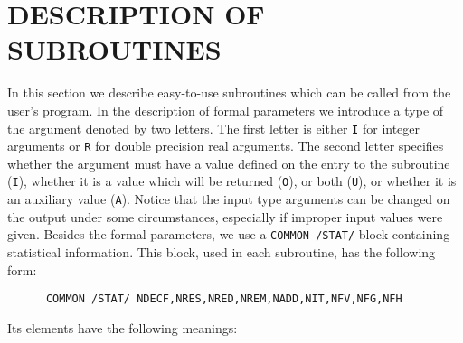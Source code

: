 \documentclass{article}
\begin{document}
\section*{DESCRIPTION OF SUBROUTINES}

\noindent In this section we describe easy-to-use subroutines
which can be called from the user's program. In the description of
formal parameters we introduce a type of the argument denoted by
two letters. The first letter is either \texttt{I} for integer
arguments or \texttt{R} for double precision real arguments. The
second letter specifies whether the argument must have a value
defined on the entry to the subroutine (\texttt{I}), whether it is a
value which will be returned (\texttt{O}), or both (\texttt{U}), or
whether it is an auxiliary value (\texttt{A}). Notice that the input
type arguments can be changed on the output under some
circumstances, especially if improper input values were given.
Besides the formal parameters, we use a \verb|COMMON /STAT/| block
containing statistical information. This block, used in each
subroutine, has the following form:

{\small

\begin{verbatim}
      COMMON /STAT/ NDECF,NRES,NRED,NREM,NADD,NIT,NFV,NFG,NFH
\end{verbatim}

}

Its elements have the following meanings:

\vspace{2mm}
\end{document}

